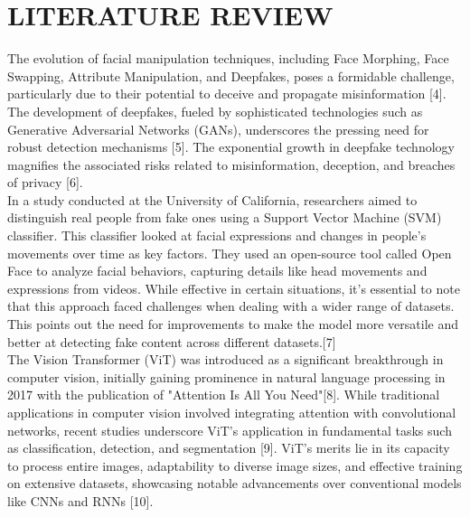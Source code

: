 \section{LITERATURE REVIEW}

The evolution of facial manipulation techniques, including Face Morphing, Face Swapping, Attribute Manipulation, and Deepfakes, poses a formidable challenge, particularly due to their potential to deceive and propagate misinformation [4]. The development of deepfakes, fueled by sophisticated technologies such as Generative Adversarial Networks (GANs), underscores the pressing need for robust detection mechanisms [5]. The exponential growth in deepfake technology magnifies the associated risks related to misinformation, deception, and breaches of privacy [6].\\

In a study conducted at the University of California, researchers aimed to distinguish real people from fake ones using a Support Vector Machine (SVM) classifier. This classifier looked at facial expressions and changes in people's movements over time as key factors. They used an open-source tool called Open Face to analyze facial behaviors, capturing details like head movements and expressions from videos. While effective in certain situations, it's essential to note that this approach faced challenges when dealing with a wider range of datasets. This points out the need for improvements to make the model more versatile and better at detecting fake content across different datasets.[7]\\

The Vision Transformer (ViT) was introduced as a significant breakthrough in computer vision, initially gaining prominence in natural language processing in 2017 with the publication of "Attention Is All You Need"[8]. While traditional applications in computer vision involved integrating attention with convolutional networks, recent studies underscore ViT's application in fundamental tasks such as classification, detection, and segmentation [9]. ViT's merits lie in its capacity to process entire images, adaptability to diverse image sizes, and effective training on extensive datasets, showcasing notable advancements over conventional models like CNNs and RNNs [10].\\

